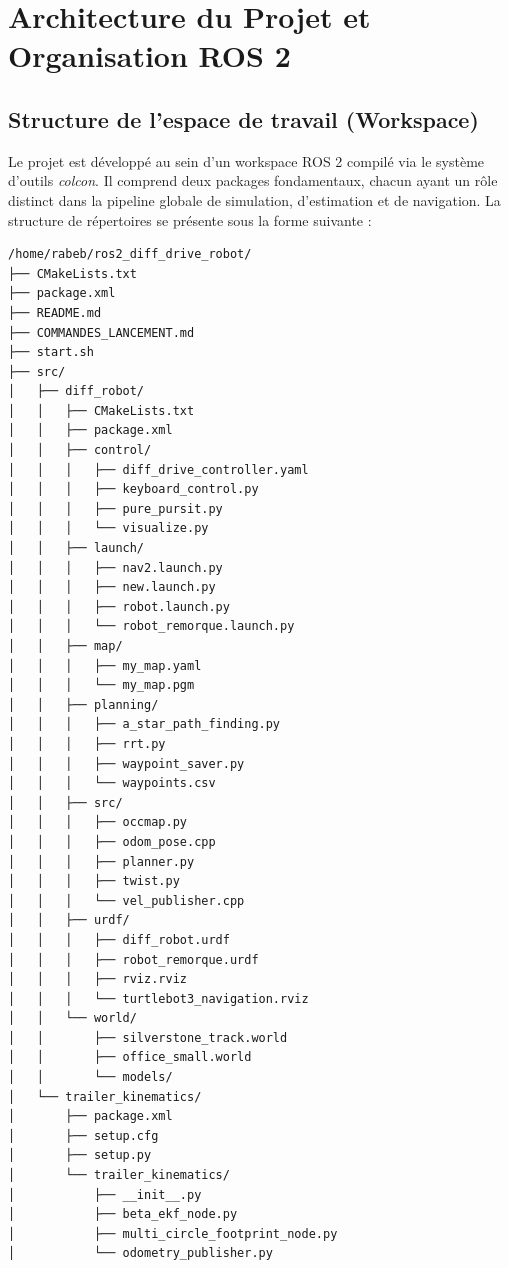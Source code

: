 \documentclass[12pt,a4paper,openany]{report}
\begin{document}
\chapter{Architecture du Projet et Organisation ROS 2} \label{ch:archi}
\section{Structure de l'espace de travail (Workspace)}
Le projet est développé au sein d'un workspace ROS 2 compilé via le système d'outils \textit{colcon}. Il comprend deux packages fondamentaux, chacun ayant un rôle distinct dans la pipeline globale de simulation, d'estimation et de navigation.
La structure de répertoires se présente sous la forme suivante :
\begin{verbatim}
/home/rabeb/ros2_diff_drive_robot/
├── CMakeLists.txt
├── package.xml
├── README.md
├── COMMANDES_LANCEMENT.md
├── start.sh
├── src/
│   ├── diff_robot/
│   │   ├── CMakeLists.txt
│   │   ├── package.xml
│   │   ├── control/
│   │   │   ├── diff_drive_controller.yaml
│   │   │   ├── keyboard_control.py
│   │   │   ├── pure_pursit.py
│   │   │   └── visualize.py
│   │   ├── launch/
│   │   │   ├── nav2.launch.py
│   │   │   ├── new.launch.py
│   │   │   ├── robot.launch.py
│   │   │   └── robot_remorque.launch.py
│   │   ├── map/
│   │   │   ├── my_map.yaml
│   │   │   └── my_map.pgm
│   │   ├── planning/
│   │   │   ├── a_star_path_finding.py
│   │   │   ├── rrt.py
│   │   │   ├── waypoint_saver.py
│   │   │   └── waypoints.csv
│   │   ├── src/
│   │   │   ├── occmap.py
│   │   │   ├── odom_pose.cpp
│   │   │   ├── planner.py
│   │   │   ├── twist.py
│   │   │   └── vel_publisher.cpp
│   │   ├── urdf/
│   │   │   ├── diff_robot.urdf
│   │   │   ├── robot_remorque.urdf
│   │   │   ├── rviz.rviz
│   │   │   └── turtlebot3_navigation.rviz
│   │   └── world/
│   │       ├── silverstone_track.world
│   │       ├── office_small.world
│   │       └── models/
│   └── trailer_kinematics/
│       ├── package.xml
│       ├── setup.cfg
│       ├── setup.py
│       └── trailer_kinematics/
│           ├── __init__.py
│           ├── beta_ekf_node.py
│           ├── multi_circle_footprint_node.py
│           └── odometry_publisher.py
\end{verbatim}
\end{document}
